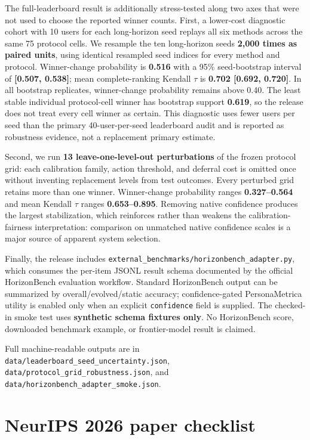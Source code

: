 \documentclass[
  10pt,
  letterpaper,
]{article}
\begin{document}
The full-leaderboard result is additionally stress-tested along two axes
that were not used to choose the reported winner counts. First, a
lower-cost diagnostic cohort with 10 users for each long-horizon seed
replays all six methods across the same 75 protocol cells. We resample
the ten long-horizon seeds \textbf{2,000 times as paired units}, using
identical resampled seed indices for every method and protocol.
Winner-change probability is \textbf{0.516} with a 95\% seed-bootstrap
interval of \textbf{{[}0.507, 0.538{]}}; mean complete-ranking Kendall
\(\tau\) is \textbf{0.702 {[}0.692, 0.720{]}}. In all bootstrap
replicates, winner-change probability remains above 0.40. The least
stable individual protocol-cell winner has bootstrap support
\textbf{0.619}, so the release does not treat every cell winner as
certain. This diagnostic uses fewer users per seed than the primary
40-user-per-seed leaderboard audit and is reported as robustness
evidence, not a replacement primary estimate.

Second, we run \textbf{13 leave-one-level-out perturbations} of the
frozen protocol grid: each calibration family, action threshold, and
deferral cost is omitted once without inventing replacement levels from
test outcomes. Every perturbed grid retains more than one winner.
Winner-change probability ranges \textbf{0.327--0.564} and mean Kendall
\(\tau\) ranges \textbf{0.653--0.895}. Removing native confidence
produces the largest stabilization, which reinforces rather than weakens
the calibration-fairness interpretation: comparison on unmatched native
confidence scales is a major source of apparent system selection.

Finally, the release includes
\texttt{external\_benchmarks/horizonbench\_adapter.py}, which consumes
the per-item JSONL result schema documented by the official HorizonBench
evaluation workflow. Standard HorizonBench output can be summarized by
overall/evolved/static accuracy; confidence-gated PersonaMetrica utility
is enabled only when an explicit \texttt{confidence} field is supplied.
The checked-in smoke test uses \textbf{synthetic schema fixtures only}.
No HorizonBench score, downloaded benchmark example, or frontier-model
result is claimed.

Full machine-readable outputs are in
\texttt{data/leaderboard\_seed\_uncertainty.json},
\texttt{data/protocol\_grid\_robustness.json}, and
\texttt{data/horizonbench\_adapter\_smoke.json}.

\section{NeurIPS 2026 paper
checklist}\label{neurips-2026-paper-checklist}
\end{document}
